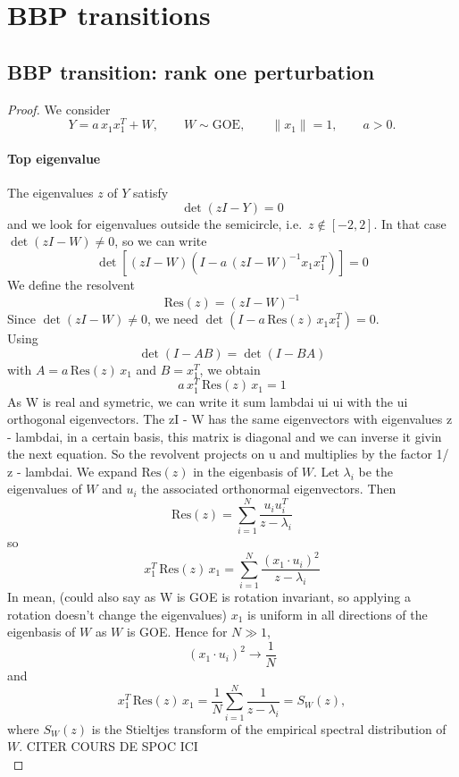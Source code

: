 \section{BBP transitions}
\subsection{BBP transition: rank one perturbation}
\begin{proof} 
    We consider
    \[
    Y = a\, x_1 x_1^T + W, \qquad W \sim \mathrm{GOE}, \qquad \|x_1\| = 1, \qquad a > 0.
    \]
    \paragraph{Top eigenvalue}
    
    The eigenvalues $z$ of $Y$ satisfy
    \[
    \det(z I - Y) = 0
    \]
    and we look for eigenvalues outside the semicircle, i.e.\ $z \notin [-2,2]$. In that case $\det(z I - W) \neq 0$, so we can write
    \[
    \det\left[ (z I - W)\left( I - a\, (z I - W)^{-1} x_1 x_1^T \right) \right] = 0
    \]
    We define the resolvent
    \[
    \mathrm{Res}(z) = (z I - W)^{-1} 
    \]
    Since $\det(z I - W) \neq 0$, we need $\det\left( I - a\, \mathrm{Res}(z)\, x_1 x_1^T \right) = 0$. \\
    Using
    \[
    \det(I - AB) = \det(I - BA)
    \]
    with $A = a\, \mathrm{Res}(z)\, x_1$ and $B = x_1^T$, we obtain
    \[
    a\, x_1^T\, \mathrm{Res}(z)\, x_1 = 1
    \]
    As W is real and symetric, we can write it sum lambdai ui ui with the ui orthogonal eigenvectors. The zI -  W has the same eigenvectors with eigenvalues z - lambdai, in a certain basis, this matrix is diagonal and we can inverse it givin the next equation. So the revolvent projects on u and multiplies by the factor 1/ z - lambdai.
    We expand $\mathrm{Res}(z)$ in the eigenbasis of $W$. Let $\lambda_i$ be the eigenvalues of $W$ and $u_i$ the associated orthonormal eigenvectors. Then
    \[
    \mathrm{Res}(z) = \sum_{i=1}^{N} \frac{u_i u_i^T}{z - \lambda_i}
    \]
    so
    \[
    x_1^T\, \mathrm{Res}(z)\, x_1 = \sum_{i=1}^{N} \frac{(x_1 \cdot u_i)^2}{z - \lambda_i}
    \]
    In mean, (could also say as W is GOE is rotation invariant, so applying a rotation doesn't change the eigenvalues) $x_1$ is uniform in all directions of the eigenbasis of $W$ as $W$ is GOE. Hence for $N \gg 1$,
    \[
    (x_1 \cdot u_i)^2 \to \frac{1}{N}
    \]
    and
    \[
    x_1^T\, \mathrm{Res}(z)\, x_1 = \frac{1}{N} \sum_{i=1}^{N} \frac{1}{z - \lambda_i} = S_W(z),
    \]
    where $S_W(z)$ is the Stieltjes transform of the empirical spectral distribution of $W$. CITER COURS DE SPOC ICI\\

\end{proof}
